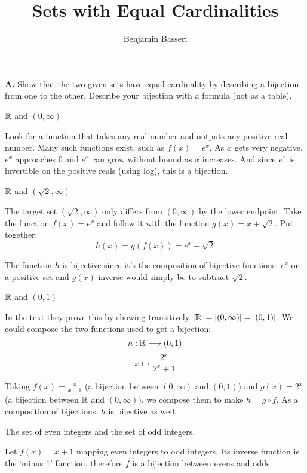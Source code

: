 \documentclass{article}
\title{Sets with Equal Cardinalities}
\author{Benjamin Basseri}
\begin{document}
\maketitle

\textbf{A.} Show that the two given sets have equal cardinality by describing a bijection from one to the other. Describe your bijection with a formula (not as a table).

\begin{problem}
$\mathbb{R}$ and $(0, \infty)$
\end{problem}

Look for a function that takes any real number and outputs any positive real number. Many such functions exist, such as $f(x) = e^x$. As $x$ gets very negative, $e^x$ approaches 0 and $e^x$ can grow without bound as $x$ increases. And since $e^x$ is invertible on the positive reals (using log), this is a bijection.

\begin{problem}
$\mathbb{R}$ and $(\sqrt{2}, \infty)$
\end{problem}

The target set $(\sqrt{2}, \infty)$ only differs from $(0, \infty)$ by the lower endpoint. Take the function $f(x) = e^x$ and follow it with the function $g(x) = x + \sqrt{2}$. Put together:
$$h(x) = g(f(x)) = e^x + \sqrt{2}$$

The function $h$ is bijective since it's the composition of bijective functions: $e^x$ on a positive set and $g(x)$ inverse would simply be to subtract $\sqrt{2}$.

\begin{problem}
$\mathbb{R}$ and $(0, 1)$
\end{problem}

In the text they prove this by showing transitively $|\mathbb{R}| = |(0, \infty)| = |(0, 1)|$. We could compose the two functions used to get a bijection:
$$h: \mathbb{R} \longrightarrow (0, 1)$$
$$x \longmapsto \frac{2^x}{2^x + 1}$$

Taking $f(x) = \frac{x}{x + 1}$ (a bijection between $(0, \infty)$ and $(0, 1)$) and $g(x) = 2^x$ (a bijection between $\mathbb{R}$ and $(0, \infty)$), we compose them to make $h = g \circ f$. As a composition of bijections, $h$ is bijective as well.

\begin{problem}
The set of even integers and the set of odd integers.
\end{problem}

Let $f(x) = x + 1$ mapping even integers to odd integers. Its inverse function is the `minus 1' function, therefore $f$ is a bijection between evens and odds.
\end{document}
